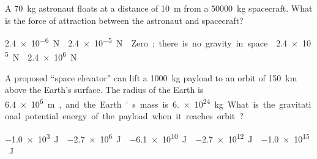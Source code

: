 \documentclass{../../oss-classkick-exam}
\begin{document}
\genheader


\genmultidirections

\gengravity

\raggedcolumns
\begin{questions}
  \begin{multicols*}{2}
    \question A \SI{70}{\kilo\gram} astronaut floats at a distance of
    \SI{10}{\metre} from a \SI{50000}{\kilo\gram} spacecraft. What is the force
    of attraction between the astronaut and spacecraft?
    \begin{choices}
      \choice\SI{2.4e-6}\newton
      \choice\SI{2.4e-5}\newton
      \choice Zero; there is no gravity in space.
      \choice\SI{2.4e5}\newton
      \choice\SI{2.4e6}\newton
    \end{choices}
    \vspace{.5in}
    
    
    \question A proposed ``space elevator'' can lift a \SI{1000}{\kilo\gram}
    payload to an orbit of \SI{150}{\kilo\metre} above the Earth's surface. The
    radius of the Earth is \SI{6.4e6}\metre, and the Earth's mass is
    \SI{6.e24}{\kilo\gram}. What is the gravitational potential energy of the
    payload when it reaches orbit?
    \begin{choices}
      \choice\SI{-1.0e3}\joule
      \choice\SI{-2.7e6}\joule
      \choice\SI{-6.1e10}\joule
      \choice\SI{-2.7e12}\joule
      \choice\SI{-1.0e15}\joule
    \end{choices}
    
%    


\end{multicols*}
\end{questions}
\end{document}
